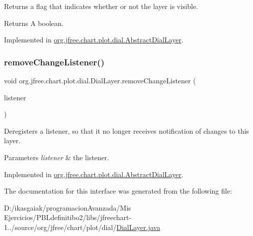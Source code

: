 Returns a flag that indicates whether or not the layer is visible.

\begin{DoxyReturn}{Returns}
A boolean. 
\end{DoxyReturn}


Implemented in \mbox{\hyperlink{classorg_1_1jfree_1_1chart_1_1plot_1_1dial_1_1_abstract_dial_layer_a0e4e9aff1a280718d2018d9e94c28027}{org.\+jfree.\+chart.\+plot.\+dial.\+Abstract\+Dial\+Layer}}.

\mbox{\label{interfaceorg_1_1jfree_1_1chart_1_1plot_1_1dial_1_1_dial_layer_a8c8d3fc6fc08c79c96bd216e9af5a28a}} 
\subsubsection{\texorpdfstring{remove\+Change\+Listener()}{removeChangeListener()}}
{\footnotesize\ttfamily void org.\+jfree.\+chart.\+plot.\+dial.\+Dial\+Layer.\+remove\+Change\+Listener (\begin{DoxyParamCaption}\item[{\mbox{\hyperlink{interfaceorg_1_1jfree_1_1chart_1_1plot_1_1dial_1_1_dial_layer_change_listener}{Dial\+Layer\+Change\+Listener}}}]{listener }\end{DoxyParamCaption})}

Deregisters a listener, so that it no longer receives notification of changes to this layer.


\begin{DoxyParams}{Parameters}
{\em listener} & the listener. \\
\hline
\end{DoxyParams}


Implemented in \mbox{\hyperlink{classorg_1_1jfree_1_1chart_1_1plot_1_1dial_1_1_abstract_dial_layer_a584dfebd9266b2be68b75916812a3b8f}{org.\+jfree.\+chart.\+plot.\+dial.\+Abstract\+Dial\+Layer}}.



The documentation for this interface was generated from the following file\+:\begin{DoxyCompactItemize}
\item 
D\+:/ikasgaiak/programacion\+Avanzada/\+Mis Ejercicios/\+P\+B\+Ldefinitibo2/libs/jfreechart-\/1../source/org/jfree/chart/plot/dial/\mbox{\hyperlink{_dial_layer_8java}{Dial\+Layer.\+java}}\end{DoxyCompactItemize}
